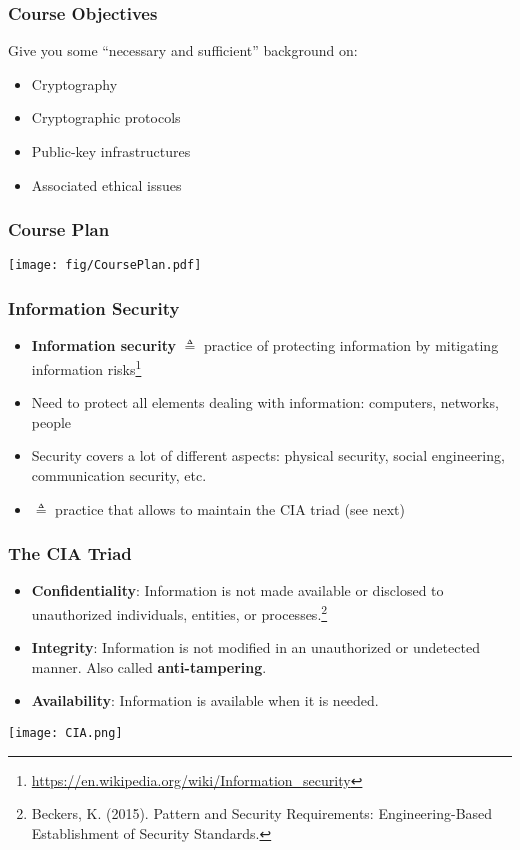 \documentclass[
hyperref={pdfpagelabels=false}
,xcolor=table
]
{beamer}
\begin{document}
\begin{frame}
  \frametitle{Course Objectives}
  Give you some ``necessary and sufficient'' background on:
  \begin{itemize}
  \item Cryptography
  \item Cryptographic protocols
  \item Public-key infrastructures
  \item Associated ethical issues
  \end{itemize}
\end{frame}

\begin{frame}
  \frametitle{Course Plan}

  \begin{center}
    \texttt{[image: fig/CoursePlan.pdf]}
  \end{center}  
\end{frame}


\begin{frame}
  \frametitle{Information Security}

  \begin{itemize}
  \item \textbf{Information security} $\triangleq$ practice of
    protecting information by mitigating information
    risks\footnote{\url{https://en.wikipedia.org/wiki/Information_security}}
  \item Need to protect all elements dealing with information: computers, networks, people
  \item Security covers a lot of different aspects:  physical security, social engineering, communication security, etc. 
  \item $\triangleq$ practice that allows to maintain the CIA triad (see next)
  \end{itemize}
\end{frame}


\begin{frame}
  \frametitle{The CIA Triad}
  \begin{itemize}
  \item \textbf{Confidentiality}: Information is not made available or
    disclosed to unauthorized individuals, entities, or
    processes.\footnote{Beckers, K. (2015). Pattern and Security
      Requirements: Engineering-Based Establishment of Security
      Standards.}
  \item \textbf{Integrity}: Information is not modified in an unauthorized or
    undetected manner. Also called \textbf{anti-tampering}.
  \item \textbf{Availability}: Information is available when it is needed.
  \end{itemize}

  \begin{center}
    \texttt{[image: CIA.png]}
  \end{center}
  
\end{frame}
\end{document}
